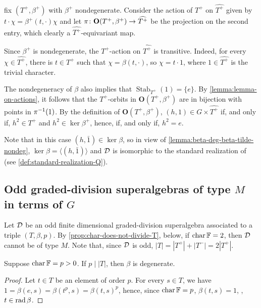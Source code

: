 fix $(T^+, \beta^+)$ with $\beta^+$ nondegenerate. 
Consider the action of $T^+$ on $\widehat{T^+}$ given by $t\cdot \chi = \beta^+(t,\cdot) \chi$ and let $\pi\colon \mathbf {O} (T^+, \beta^+) \to \widehat{T^+}$ be the projection on the second entry, which clearly a $\widehat{T^+}$-equivariant map. 

Since $\beta^+$ is nondegenerate, the $T^+$-action on $\widehat{T^+}$ is transitive. 
Indeed, for every $\chi \in \widehat{T^+}$, there is $t \in T^+$ such that $\chi = \beta(t, \cdot)$, so $\chi = t \cdot 1$, where $1\in \widehat{T^+}$ is the trivial character. 

The nondegeneracy of $\beta$ also implies that $\operatorname{Stab}_{T^+} (1) = \{e \}$. 
By \cref{lemma:lemma-on-actions}, it follows that the $T^+$-orbits in $\mathbf {O} (T^+, \beta^+)$ are in bijection with points in $\pi^{-1} (1)$. 
By the definition of $\mathbf {O} (T^+, \beta^+)$, $(h, 1) \in G \times \widehat{T^+}$ if, and only if, $h^2 \in T^+$ and $h^2 \in \ker \beta^+$, hence, if, and only if, $h^2 = e$. 

Note that in this case $(h, \bar 1) \in \ker \beta$, so in view of \cref{lemma:beta-deg-beta-tilde-nondeg}, $\ker \beta = \langle (h, \bar 1) \rangle$ and $\mathcal{D}$ is isomorphic to the standard realization of (see \cref{def:standard-realization-Q}).

\subsection{Odd graded-division superalgebras of type \texorpdfstring{$M$}{M} in terms of \texorpdfstring{$G$}{M}}

Let $\mathcal{D}$ be an odd finite dimensional graded-division superalgebra associated to a triple $(T, \beta, p)$. 
By \cref{prop:char-does-not-divide-T}, below, if $\operatorname{char} \mathbb{F} = 2$, then $\mathcal{D}$ cannot be of type $M$. 
Note that, since $\mathcal{D}$ is odd, $|T| = |T^+| + |T^-| = 2|T^+|$.

\begin{prop}\label{prop:char-does-not-divide-T}
    Suppose $\operatorname{char} \mathbb{F} = p > 0$. 
    If $p \mid |T|$, then $\beta$ is degenerate.
\end{prop}

\begin{proof}
    Let $t\in T$ be an element of order $p$. 
    For every $s\in T$, we have $1 = \beta(e, s) = \beta(t^p, s) = \beta(t, s)^p$, hence, since $\operatorname{char} \mathbb{F} = p$, $\beta(t, s) = 1$, \ie, $t\in \operatorname{rad} \beta$. 
\end{proof}
 
